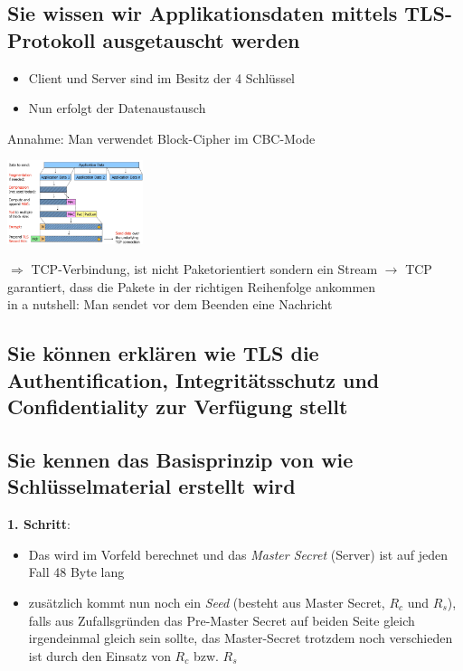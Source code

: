 \documentclass{report}
\newenvironment{Figure}
	{\par\medskip\noindent\minipage{\linewidth}}
	{\endminipage\par\medskip}
\theoremstyle{definition}
\theoremstyle{example}
\begin{document}
	\subsection{Sie wissen wir Applikationsdaten mittels TLS-Protokoll ausgetauscht werden}
\begin{itemize}
	\item Client und Server sind im Besitz der 4 Schlüssel
	\item Nun erfolgt der Datenaustausch
\end{itemize}

Annahme: Man verwendet Block-Cipher im CBC-Mode

\begin{Figure}
\centering
\includegraphics[width=150px]{img/TLSSendingData.png}
	\label{fig:Abbildung des Ablaufs eines TLS Dataaustausch}
\end{Figure}
$\Rightarrow$ TCP-Verbindung, ist nicht Paketorientiert sondern ein Stream $\rightarrow$ TCP garantiert, dass die Pakete in der richtigen Reihenfolge ankommen\\

in a nutshell: Man sendet vor dem Beenden eine Nachricht 

	\subsection{Sie können erklären wie TLS die Authentification, Integritätsschutz und Confidentiality zur Verfügung stellt}
	
	\subsection{Sie kennen das Basisprinzip von wie Schlüsselmaterial erstellt wird}
\textbf{1. Schritt}:
\begin{itemize}
	\item Das  wird im Vorfeld berechnet und das \textit{Master Secret} (Server) ist auf jeden Fall 48 Byte lang 
	\item zusätzlich kommt nun noch ein \textit{Seed} (besteht aus Master Secret, $R_c$ und $R_s$), falls aus Zufallsgründen das Pre-Master Secret auf beiden Seite gleich irgendeinmal gleich sein sollte, das Master-Secret trotzdem noch verschieden ist durch den Einsatz von $R_c$ bzw. $R_s$
\end{itemize}
\end{document}

